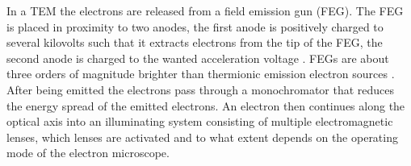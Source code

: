 In a TEM the electrons are released from a field emission gun (FEG). 
The FEG is placed in proximity to two anodes, the first anode is positively charged to several kilovolts such that it extracts electrons from the tip of the FEG, the second anode is charged to the wanted acceleration voltage \cite{Williams2009-ww}.
FEGs are about three orders of magnitude brighter than thermionic emission electron sources \cite{field-emission}.
After being emitted the electrons pass through a monochromator that reduces the energy spread of the emitted electrons. An electron then continues along the optical axis into an illuminating system consisting of multiple electromagnetic lenses, which lenses are activated and to what extent depends on the operating mode of the electron microscope.

